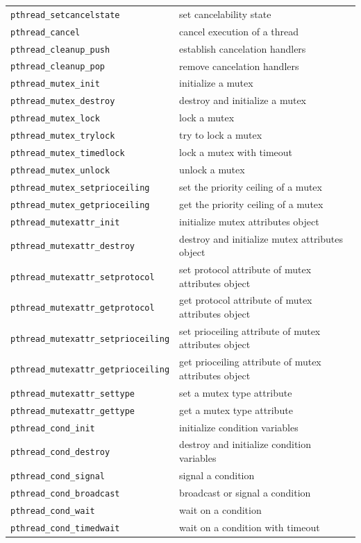 \documentclass[a4paper,10pt,twoside]{report}
\begin{document}
\begin{longtable}{|l|l|}
\texttt{pthread\_setcancelstate} & set cancelability state  \\
\texttt{pthread\_cancel} & cancel execution of a thread\\
\texttt{pthread\_cleanup\_push} & establish cancelation handlers\\
\texttt{pthread\_cleanup\_pop} & remove cancelation handlers\\ \hline


\texttt{pthread\_mutex\_init} & initialize a mutex \\
\texttt{pthread\_mutex\_destroy} & destroy and initialize a mutex \\
\texttt{pthread\_mutex\_lock} & lock a mutex \\
\texttt{pthread\_mutex\_trylock} & try to lock a mutex  \\
\texttt{pthread\_mutex\_timedlock} &  lock a mutex with timeout\\
\texttt{pthread\_mutex\_unlock} & unlock a mutex\\ \hline

\texttt{pthread\_mutex\_setprioceiling} &  set the priority ceiling of a mutex \\ 
\texttt{pthread\_mutex\_getprioceiling} & get the priority ceiling of a mutex\\ \hline
  


\texttt{pthread\_mutexattr\_init} &  initialize mutex attributes object\\
\texttt{pthread\_mutexattr\_destroy} & destroy and initialize mutex attributes object\\
\texttt{pthread\_mutexattr\_setprotocol} & set protocol attribute of mutex attributes object \\
\texttt{pthread\_mutexattr\_getprotocol} & get  protocol attribute of mutex attributes object \\
\texttt{pthread\_mutexattr\_setprioceiling} & set prioceiling attribute of mutex attributes object \\
\texttt{pthread\_mutexattr\_getprioceiling} & get prioceiling attribute of mutex attributes object\\
\texttt{pthread\_mutexattr\_settype} & set a mutex type attribute\\
\texttt{pthread\_mutexattr\_gettype} & get a mutex type attribute\\ \hline

\texttt{pthread\_cond\_init} &  initialize condition variables\\
\texttt{pthread\_cond\_destroy} & destroy and initialize condition variables\\
\texttt{pthread\_cond\_signal} & signal a condition\\
\texttt{pthread\_cond\_broadcast} & broadcast or signal a condition\\
\texttt{pthread\_cond\_wait} &  wait on a condition\\
\texttt{pthread\_cond\_timedwait} & wait on a condition with timeout\\ \hline


\end{longtable}
\end{document}
